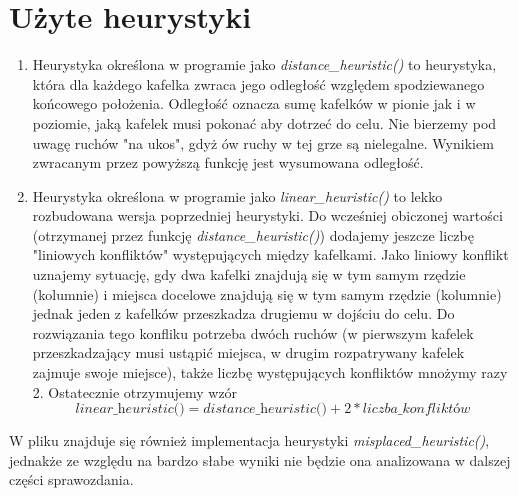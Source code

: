 \documentclass[a4paper,14pt]{report}
\begin{document}
\section{Użyte heurystyki}
\begin{enumerate}
	\item Heurystyka określona w programie jako \textit{distance\_heuristic()} to heurystyka, która dla każdego kafelka zwraca jego odległość względem spodziewanego końcowego położenia. Odległość oznacza sumę kafelków w pionie jak i w poziomie, jaką kafelek musi pokonać aby dotrzeć do celu. Nie bierzemy pod uwagę ruchów "na ukos", gdyż ów ruchy w tej grze są nielegalne. Wynikiem zwracanym przez powyższą funkcję jest wysumowana odległość.
	\item Heurystyka określona w programie jako \textit{linear\_heuristic()} to lekko rozbudowana wersja poprzedniej heurystyki. Do wcześniej obiczonej wartości (otrzymanej przez funkcję \textit{distance\_heuristic()}) dodajemy jeszcze liczbę "liniowych konfliktów" występujących między kafelkami. Jako liniowy konflikt uznajemy sytuację, gdy dwa kafelki znajdują się w tym samym rzędzie (kolumnie) i miejsca docelowe znajdują się w tym samym rzędzie (kolumnie) jednak jeden z kafelków przeszkadza drugiemu w dojściu do celu. Do rozwiązania tego konfliku potrzeba dwóch ruchów (w pierwszym kafelek przeszkadzający musi ustąpić miejsca, w drugim rozpatrywany kafelek zajmuje swoje miejsce), także liczbę występujących konfliktów mnożymy razy 2.
	Ostatecznie otrzymujemy wzór
	\begin{equation}
		\textit{linear\_heuristic()} = \textit{distance\_heuristic()}  + 2 * liczba\_konfliktów
	\end{equation}
\end{enumerate}
W pliku znajduje się również implementacja heurystyki \textit{misplaced\_heuristic()}, jednakże ze względu na bardzo słabe wyniki nie będzie ona analizowana w dalszej części sprawozdania.
\end{document}
